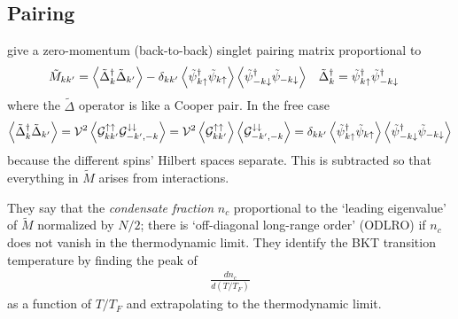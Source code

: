 \subsection{Pairing}\label{sec:pairing}

 give a zero-momentum (back-to-back) singlet pairing matrix proportional to
\begin{align}
    \tilde{M}_{kk'} &=
    \left\langle \tilde{\Delta}{}^{\dagger}_k \tilde{\Delta}_{k'} \right\rangle
    -   \delta_{kk'}
        \left\langle \tilde{\psi}{}^{\dagger}_{k\uparrow} \tilde{\psi}_{k\uparrow} \right\rangle
        \left\langle \tilde{\psi}{}^{\dagger}_{-k\downarrow} \tilde{\psi}_{-k\downarrow} \right\rangle
    &
    \tilde{\Delta}{}^{\dagger}_k &= \tilde{\psi}{}^{\dagger}_{k\uparrow} \tilde{\psi}{}^{\dagger}_{-k\downarrow}
    \label{eq:PRL129076403 pairing}
\end{align}
where the $\tilde{\Delta}$ operator is like a Cooper pair.
In the free case
\begin{align}
    \left\langle \tilde{\Delta}{}^{\dagger}_k \tilde{\Delta}_{k'} \right\rangle
    =
    \mathcal{V}^2\left\langle  \mathcal{G}^{\uparrow\uparrow}_{kk'} \mathcal{G}^{\downarrow\downarrow}_{-k',-k}  \right\rangle
    =
    \mathcal{V}^2\left\langle  \mathcal{G}^{\uparrow\uparrow}_{kk'}  \right\rangle \left\langle  \mathcal{G}^{\downarrow\downarrow}_{-k',-k}  \right\rangle
    =
    \delta_{kk'}
    \left\langle \tilde{\psi}{}^{\dagger}_{k\uparrow} \tilde{\psi}_{k\uparrow} \right\rangle
    \left\langle \tilde{\psi}{}^{\dagger}_{-k\downarrow} \tilde{\psi}_{-k\downarrow} \right\rangle
\end{align}
because the different spins' Hilbert spaces separate.
This is subtracted so that everything in $\tilde{M}$ arises from interactions.

They say that the \emph{condensate fraction} $n_c$ proportional to the `leading eigenvalue' of $\tilde{M}$ normalized by $N/2$; there is `off-diagonal long-range order' (ODLRO) if $n_c$ does not vanish in the thermodynamic limit.
They identify the BKT transition temperature by finding the peak of
\begin{align}
    \frac{d n_c}{d(T/T_F)}
\end{align}
as a function of $T/T_F$ and extrapolating to the thermodynamic limit.

